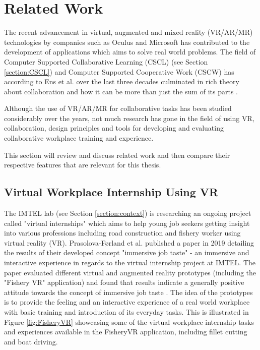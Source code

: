 
\chapter{Related Work}
The recent advancement in virtual, augmented and mixed reality (VR/AR/MR) technologies by companies such as Oculus and Microsoft 
has contributed to the development of applications which aims to solve real world problems. The field of Computer Supported Collaborative Learning (CSCL) (see Section \ref{section:CSCL}) and Computer Supported Cooperative Work (CSCW) has according to Ens et al. over the last three decades culminated in rich theory about collaboration and how it can be more than just the sum of its parts \cite{ens2019revisiting}.

Although the use of VR/AR/MR for collaborative tasks has been studied considerably over the years, not much research has gone in the field of using VR, collaboration, design principles and tools for developing and evaluating collaborative workplace training and experience. 

This section will review and discuss related work and then compare their respective features that are relevant for this thesis. 





\section{Virtual Workplace Internship Using VR}
The IMTEL lab (see Section \ref{section:context}) is researching an ongoing project called "virtual internships" which aims to help young job seekers getting insight into various professions including road construction and fishery worker using virtual reality (VR). Prasolova-Førland et al. \cite{prasolova2019empowering} published a paper in 2019 detailing the results of their developed concept "immersive job taste" - an immersive and interactive experience in regards to the virtual internship project at IMTEL. The paper evaluated different virtual and augmented reality prototypes (including the "Fishery VR" application) and found that results indicate a generally positive attitude towards the concept of immersive job taste \cite{prasolova2019empowering}. The idea of the prototypes is to provide the feeling and an interactive experience of a real world workplace with basic training and introduction of its everyday tasks. This is illustrated in Figure \ref{fig:FisheryVR} showcasing some of the virtual workplace internship tasks and experiences available in the FisheryVR application, including fillet cutting and boat driving. 

